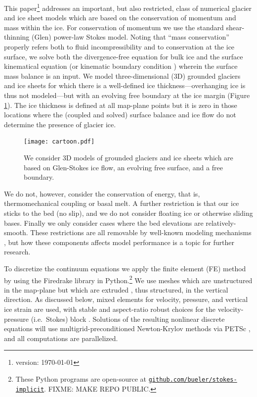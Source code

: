 \documentclass[letterpaper,final,12pt,reqno]{amsart}
\begin{document}
This paper\footnote{version: \today} addresses an important, but also restricted, class of numerical glacier and ice sheet models which are based on the conservation of momentum and mass within the ice.  For conservation of momentum we use the standard shear-thinning (Glen) power-law Stokes model.  Noting that ``mass conservation'' properly refers both to fluid incompressibility and to conservation at the ice surface, we solve both the divergence-free equation for bulk ice and the surface kinematical equation (or kinematic boundary condition \cite{GreveBlatter2009}) wherein the surface mass balance is an input.  We model three-dimensional (3D) grounded glaciers and ice sheets for which there is a well-defined ice thickness---overhanging ice is thus not modeled---but with an evolving free boundary at the ice margin \cite{SchoofHewitt2013} (Figure \ref{fig:cartoon}).  The ice thickness is defined at all map-plane points but it is zero in those locations where the (coupled and solved) surface balance and ice flow do not determine the presence of glacier ice.

\begin{figure}[h]
\begin{center}
\texttt{[image: cartoon.pdf]}
\end{center}
\caption{We consider 3D models of grounded glaciers and ice sheets which are based on Glen-Stokes ice flow, an evolving free surface, and a free boundary.}
\label{fig:cartoon}
\end{figure}

We do not, however, consider the conservation of energy, that is, thermomechanical coupling or basal melt.  A further restriction is that our ice sticks to the bed (no slip), and we do not consider floating ice or otherwise sliding bases.  Finally we only consider cases where the bed elevations are relatively-smooth.  These restrictions are all removable by well-known modeling mechanisms \cite[for example]{Aschwandenetal2012,Winkelmannetal2011}, but how these components affects model performance is a topic for further research.

To discretize the continuum equations we apply the finite element (FE) method \cite{Elmanetal2014} by using the Firedrake library \cite{Rathgeberetal2016} in Python.\footnote{These Python programs are open-source at \href{https://github.com/bueler/stokes-implicit}{\texttt{github.com/bueler/stokes-implicit}}.  FIXME: MAKE REPO PUBLIC.}  We use meshes which are unstructured in the map-plane but which are extruded \cite{Gibsonetal2019}, thus structured, in the vertical direction.  As discussed below, mixed elements for velocity, pressure, and vertical ice strain are used, with stable and aspect-ratio robust choices for the velocity-pressure (i.e.~Stokes) block \cite{Elmanetal2014}.  Solutions of the resulting nonlinear discrete equations will use multigrid-preconditioned Newton-Krylov methods \cite{Bueler2021} via PETSc \cite{Balayetal2020}, and all computations are parallelized.
\end{document}
